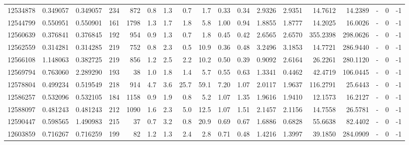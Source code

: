 \begin{tabular}{rrrrrrrrrrrrrrrlrr}
  12534878 & 0.349057 &   0.349057 &  234 &  872 &      0.8 &      1.3 &     0.7 &      1.7 &       0.33 &        0.34 &  2.9326 &  2.9351 &   14.7612 &   14.2389 &             - &        0 &         -1 \\
  12544799 & 0.550951 &   0.550901 &  161 & 1798 &      1.3 &      1.7 &     1.8 &      5.8 &       1.00 &        0.94 &  1.8855 &  1.8777 &   14.2025 &   16.0026 &             - &        0 &         -1 \\
  12560639 & 0.376841 &   0.376845 &  192 &  954 &      0.9 &      1.3 &     0.7 &      1.8 &       0.45 &        0.42 &  2.6565 &  2.6570 &  355.2398 &  298.0626 &             - &        0 &         -1 \\
  12562559 & 0.314281 &   0.314285 &  219 &  752 &      0.8 &      2.3 &     0.5 &     10.9 &       0.36 &        0.48 &  3.2496 &  3.1853 &   14.7721 &  286.9440 &             - &        0 &         -1 \\
  12566108 & 1.148063 &   0.382725 &  219 &  856 &      1.2 &      2.5 &     2.2 &     10.2 &       0.50 &        0.39 &  0.9092 &  2.6164 &   26.2261 &  280.1120 &             - &        0 &         -1 \\
  12569794 & 0.763060 &   2.289290 &  193 &   38 &      1.0 &      1.8 &     1.4 &      5.7 &       0.55 &        0.63 &  1.3341 &  0.4462 &   42.4719 &  106.0445 &             - &        0 &         -1 \\
  12578804 & 0.499234 &   0.519549 &  218 &  914 &      4.7 &      3.6 &    25.7 &     59.1 &       7.20 &        1.07 &  2.0117 &  1.9637 &  116.2791 &   25.6443 &             - &        0 &         -1 \\
  12586257 & 0.532096 &   0.532105 &  184 & 1158 &      0.9 &      1.9 &     0.8 &      5.2 &       1.07 &        1.35 &  1.9616 &  1.9410 &   12.1573 &   16.2127 &             - &        0 &         -1 \\
  12588097 & 0.481243 &   0.481243 &  212 & 1090 &      1.6 &      2.3 &     5.0 &     12.5 &       1.07 &        1.51 &  2.1457 &  2.1156 &   14.7558 &   26.5781 &             - &        0 &         -1 \\
  12590447 & 0.598565 &   1.490983 &  215 &   37 &      0.7 &      3.2 &     0.8 &     20.9 &       0.69 &        0.67 &  1.6886 &  0.6828 &   55.6638 &   82.4402 &             - &        0 &         -1 \\
  12603859 & 0.716267 &   0.716259 &  199 &   82 &      1.2 &      1.3 &     2.4 &      2.8 &       0.71 &        0.48 &  1.4216 &  1.3997 &   39.1850 &  284.0909 &             - &        0 &         -1 \\

\end{tabular}
